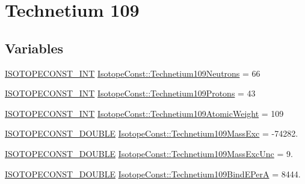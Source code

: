 \hypertarget{group___isotope_const-_technetium-_tc109}{}\section{Technetium 109}
\label{group___isotope_const-_technetium-_tc109}
\subsection*{Variables}
\begin{DoxyCompactItemize}
\item 
\mbox{\hyperlink{group___isotope_const-_macros_ga5f18360b3e99483a35c32d789e62621c}{I\+S\+O\+T\+O\+P\+E\+C\+O\+N\+S\+T\+\_\+\+I\+NT}} \mbox{\hyperlink{group___isotope_const-_technetium-_tc109_ga7124fd6cd6bab5c133b1243074a7987b}{Isotope\+Const\+::\+Technetium109\+Neutrons}} = 66
\item 
\mbox{\hyperlink{group___isotope_const-_macros_ga5f18360b3e99483a35c32d789e62621c}{I\+S\+O\+T\+O\+P\+E\+C\+O\+N\+S\+T\+\_\+\+I\+NT}} \mbox{\hyperlink{group___isotope_const-_technetium-_tc109_ga8ebdf212495b317ee0cb2e2f9d4a9c36}{Isotope\+Const\+::\+Technetium109\+Protons}} = 43
\item 
\mbox{\hyperlink{group___isotope_const-_macros_ga5f18360b3e99483a35c32d789e62621c}{I\+S\+O\+T\+O\+P\+E\+C\+O\+N\+S\+T\+\_\+\+I\+NT}} \mbox{\hyperlink{group___isotope_const-_technetium-_tc109_ga4507e10dfa99fcd2f1b16f4f2809ace3}{Isotope\+Const\+::\+Technetium109\+Atomic\+Weight}} = 109
\item 
\mbox{\hyperlink{group___isotope_const-_macros_ga8f45a7272ce02c0b4c65c44636ed719a}{I\+S\+O\+T\+O\+P\+E\+C\+O\+N\+S\+T\+\_\+\+D\+O\+U\+B\+LE}} \mbox{\hyperlink{group___isotope_const-_technetium-_tc109_ga7f1807c2a9dc750571f224da05a25a8c}{Isotope\+Const\+::\+Technetium109\+Mass\+Exc}} = -\/74282.
\item 
\mbox{\hyperlink{group___isotope_const-_macros_ga8f45a7272ce02c0b4c65c44636ed719a}{I\+S\+O\+T\+O\+P\+E\+C\+O\+N\+S\+T\+\_\+\+D\+O\+U\+B\+LE}} \mbox{\hyperlink{group___isotope_const-_technetium-_tc109_ga021cb3a56ee57b1ac786809a4de3d861}{Isotope\+Const\+::\+Technetium109\+Mass\+Exc\+Unc}} = 9.
\item 
\mbox{\hyperlink{group___isotope_const-_macros_ga8f45a7272ce02c0b4c65c44636ed719a}{I\+S\+O\+T\+O\+P\+E\+C\+O\+N\+S\+T\+\_\+\+D\+O\+U\+B\+LE}} \mbox{\hyperlink{group___isotope_const-_technetium-_tc109_ga410ba2ec2b9b524b4611d7081052ffad}{Isotope\+Const\+::\+Technetium109\+Bind\+E\+PerA}} = 8444.

\end{DoxyCompactItemize}
